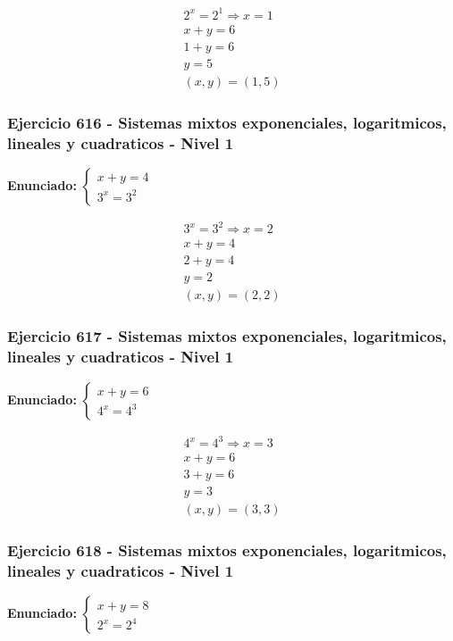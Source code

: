 \documentclass[12pt,a4paper]{article}
\begin{document}
\[
\begin{aligned}
2^x=2^{1}\Rightarrow x=1\\
x+y=6\\
1+y=6\\
y=5\\
\boxed{(x,y)=(1,5)}
\end{aligned}
\]


\subsubsection*{Ejercicio 616 - Sistemas mixtos exponenciales, logaritmicos, lineales y cuadraticos - Nivel 1}
\textbf{Enunciado:} \(\begin{cases} x+y=4\\ 3^x=3^{2}\end{cases}\)

\[
\begin{aligned}
3^x=3^{2}\Rightarrow x=2\\
x+y=4\\
2+y=4\\
y=2\\
\boxed{(x,y)=(2,2)}
\end{aligned}
\]


\subsubsection*{Ejercicio 617 - Sistemas mixtos exponenciales, logaritmicos, lineales y cuadraticos - Nivel 1}
\textbf{Enunciado:} \(\begin{cases} x+y=6\\ 4^x=4^{3}\end{cases}\)

\[
\begin{aligned}
4^x=4^{3}\Rightarrow x=3\\
x+y=6\\
3+y=6\\
y=3\\
\boxed{(x,y)=(3,3)}
\end{aligned}
\]


\subsubsection*{Ejercicio 618 - Sistemas mixtos exponenciales, logaritmicos, lineales y cuadraticos - Nivel 1}
\textbf{Enunciado:} \(\begin{cases} x+y=8\\ 2^x=2^{4}\end{cases}\)
\end{document}
